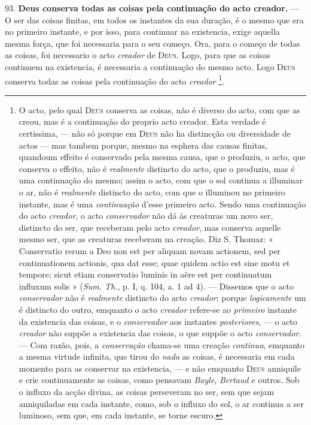  93. \textbf{Deus conserva todas as coisas pela continuação do acto creador.} --- O ser das coisas finitas, em todos os instantes da sua duração, é o mesmo que era no primeiro instante, e por isso, para continuar na existencia, exige aquella mesma força, que foi necessaria para o seu começo. Ora, para o começo de todas as coisas, foi necessario o acto \emph{creador} de \textsc{Deus}. Logo, para que as coisas continuem na existencia, é necessaria a continuação do mesmo acto. Logo \textsc{Deus} conserva todas as coisas pela continuação do acto \emph{creador} \footnote{O acto, pelo qual \textsc{Deus} conserva as coisas, não é diverso do acto, com que as creou, mas é a continuação do proprio acto creador. Esta verdade é certissima, --- não só porque em \textsc{Deus} não ha distincção ou diversidade de actos --- mas tambem porque, mesmo na esphera das causas finitas, quandoum effeito é conservado pela mesma causa, que o produziu, o acto, que conserva o effeito, não é \emph{realmente} distincto do acto, que o produziu, mas é uma continuação do mesmo; assim o acto, com que o sol continua a illuminar o ar, não é \emph{realmente} distincto do acto, com que o illuminou no primeiro instante, mas é uma \emph{continuação} d'esse primeiro acto. Sendo uma continuação do acto \emph{creador}, o acto \emph{conservador} não dá ás creaturas um novo ser, distincto do ser, que receberam pelo acto \emph{creador}, mas conserva aquelle mesmo ser, que as creaturas receberam na creação. Diz S. Thomaz: « Conservatio rerum a Deo non est per aliquam novam actionem, sed per continuationem actionis, qua dat esse; quae quidem actio est sine motu et tempore; sicut etiam conservatio luminis in aëre est per continuatum influxum solis » (\emph{Sum. Th.}, p. I, q. 104, a. 1 ad 4). --- Dissemos que o acto \emph{conservador} não é \emph{realmente} distincto do acto \emph{creador}; porque \emph{logicamente} um é distincto do outro, emquanto o acto \emph{creador} refere-se ao \emph{primeiro} instante da existencia das coisas, e o \emph{conservador} aos instantes \emph{posteriores}, --- o acto \emph{creador} não suppõe a existencia das coisas, o que suppõe o acto \emph{conservador}. --- Com razão, pois, a \emph{conservação} chama-se uma creação \emph{continua}, emquanto a mesma virtude infinita, que tirou do \emph{nada} as coisas, é necessaria em cada momento para as conservar na existencia, --- e não emquanto \textsc{Deus} anniquile e crie continuamente as coisas, como pensavam \emph{Bayle}, \emph{Bertaud} e outros. Sob o influxo da acção divina, as coisas perseveram no ser, sem que sejam anniquiladas em cada instante, como, sob o influxo do sol, o ar continua a ser luminoso, sem que, em cada instante, se torne escuro.}.

